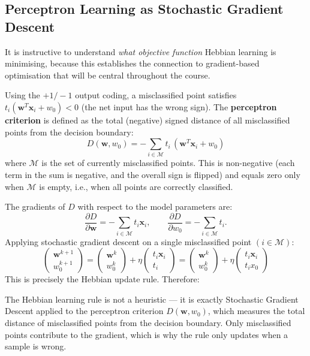 \documentclass[11pt,a4paper]{article}
\newcommand{\term}[1]{\textcolor{DefGreen}{\textbf{#1}}\index{#1}}
\begin{document}
\subsection{Perceptron Learning as Stochastic Gradient Descent}
\label{sec:percSGD}

It is instructive to understand \emph{what objective function} Hebbian learning is minimising, because this establishes the connection to gradient-based optimisation that will be central throughout the course.

Using the $+1/-1$ output coding, a misclassified point satisfies $t_i(\mathbf{w}^T\mathbf{x}_i + w_0) < 0$ (the net input has the wrong sign). The \term{perceptron criterion} is defined as the total (negative) signed distance of all misclassified points from the decision boundary:
\[
D(\mathbf{w}, w_0) = -\sum_{i \in \mathcal{M}} t_i\,(\mathbf{w}^T\mathbf{x}_i + w_0)
\]
where $\mathcal{M}$ is the set of currently misclassified points. This is non-negative (each term in the sum is negative, and the overall sign is flipped) and equals zero only when $\mathcal{M}$ is empty, i.e., when all points are correctly classified.

The gradients of $D$ with respect to the model parameters are:
\[
\frac{\partial D}{\partial \mathbf{w}} = -\sum_{i \in \mathcal{M}} t_i \mathbf{x}_i, \qquad
\frac{\partial D}{\partial w_0} = -\sum_{i \in \mathcal{M}} t_i.
\]
Applying stochastic gradient descent on a single misclassified point $(i \in \mathcal{M})$:
\[
\begin{pmatrix} \mathbf{w}^{k+1} \\ w_0^{k+1} \end{pmatrix}
= \begin{pmatrix} \mathbf{w}^k \\ w_0^k \end{pmatrix}
+ \eta \begin{pmatrix} t_i \mathbf{x}_i \\ t_i \end{pmatrix}
= \begin{pmatrix} \mathbf{w}^k \\ w_0^k \end{pmatrix}
+ \eta \begin{pmatrix} t_i \mathbf{x}_i \\ t_i x_0 \end{pmatrix}
\]
This is precisely the Hebbian update rule. Therefore:

\begin{insightbox}[Hebbian learning = SGD on the perceptron criterion]
The Hebbian learning rule is not a heuristic — it is exactly Stochastic Gradient Descent applied to the perceptron criterion $D(\mathbf{w}, w_0)$, which measures the total distance of misclassified points from the decision boundary. Only misclassified points contribute to the gradient, which is why the rule only updates when a sample is wrong.
\end{insightbox}
\end{document}
